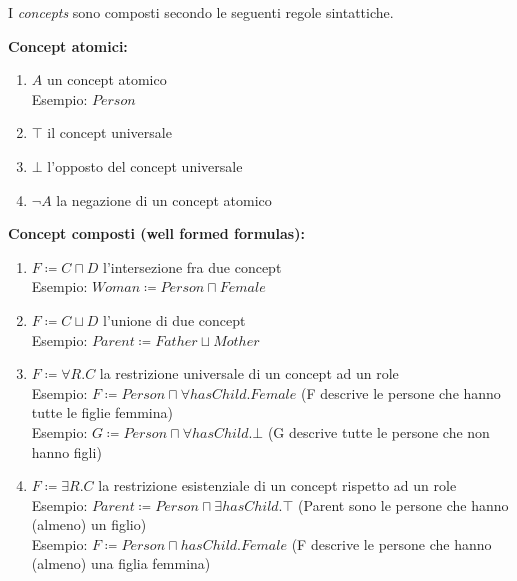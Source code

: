 \begin{fdefinition}
I \textit{concepts} sono composti secondo le seguenti regole sintattiche.

\textbf{Concept atomici:}
\begin{enumerate}
\item $A$ un concept atomico \\ Esempio: $Person$
\item $\top$ il concept universale
\item $\bot$ l'opposto del concept universale
\item $\lnot A$ la negazione di un concept atomico
\end{enumerate}
\textbf{Concept composti (well formed formulas):}
\begin{enumerate}
\item $F \coloneqq C \sqcap D$ l'intersezione fra due concept \\ Esempio: $Woman \coloneqq Person \sqcap Female$
\item $F \coloneqq C \sqcup D$ l'unione di due concept \\ Esempio: $Parent \coloneqq Father \sqcup Mother$
\item $F \coloneqq \forall R. C$ la restrizione universale di un concept ad un role \\ Esempio: $F \coloneqq Person \sqcap \forall hasChild. Female$ (F descrive le persone che hanno tutte le figlie femmina)\\ Esempio: $G \coloneqq Person \sqcap \forall hasChild.\bot$ (G descrive tutte le persone che non hanno figli)
\item $F \coloneqq \exists R. C$ la restrizione esistenziale di un concept rispetto ad un role \\ Esempio: $Parent \coloneqq Person \sqcap \exists hasChild.\top$ (Parent sono le persone che hanno (almeno) un figlio) \\ Esempio: $F \coloneqq Person \sqcap hasChild. Female$ (F descrive le persone che hanno (almeno) una figlia femmina)
\end{enumerate}
\end{fdefinition}
